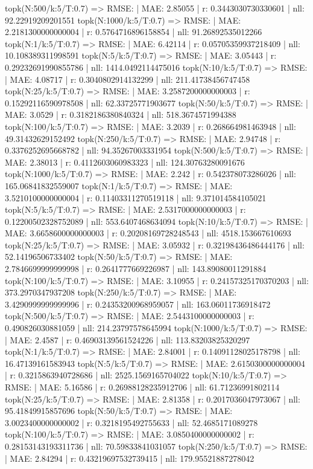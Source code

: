 topk(N:500/k:5/T:0.7) => RMSE: | MAE: 2.85055 | r: 0.3443030730330601 | nll: 92.22919209201551
topk(N:1000/k:5/T:0.7) => RMSE: | MAE: 2.2181300000000004 | r: 0.5764716896158854 | nll: 91.26892535012266
topk(N:1/k:5/T:0.7) => RMSE: | MAE: 6.42114 | r: 0.05705359937218409 | nll: 10.108389311998591
topk(N:5/k:5/T:0.7) => RMSE: | MAE: 3.05443 | r: 0.29232691990855786 | nll: 1414.0492114475016
topk(N:10/k:5/T:0.7) => RMSE: | MAE: 4.08717 | r: 0.3040802914132299 | nll: 211.41738456747458
topk(N:25/k:5/T:0.7) => RMSE: | MAE: 3.2587200000000003 | r: 0.15292116590978508 | nll: 62.33725771903677
topk(N:50/k:5/T:0.7) => RMSE: | MAE: 3.0529 | r: 0.3182186380840324 | nll: 518.3674571994388
topk(N:100/k:5/T:0.7) => RMSE: | MAE: 3.2039 | r: 0.268664981463948 | nll: 49.31432629152492
topk(N:250/k:5/T:0.7) => RMSE: | MAE: 2.94748 | r: 0.3376252695668782 | nll: 94.35267003331954
topk(N:500/k:5/T:0.7) => RMSE: | MAE: 2.38013 | r: 0.4112603060983323 | nll: 124.30763280091676
topk(N:1000/k:5/T:0.7) => RMSE: | MAE: 2.242 | r: 0.542378073286026 | nll: 165.06841832559007
topk(N:1/k:5/T:0.7) => RMSE: | MAE: 3.5210100000000004 | r: 0.11403311270519118 | nll: 9.371014584105021
topk(N:5/k:5/T:0.7) => RMSE: | MAE: 2.5317000000000003 | r: 0.12200502328752089 | nll: 553.6407468634094
topk(N:10/k:5/T:0.7) => RMSE: | MAE: 3.6658600000000003 | r: 0.20208169728248543 | nll: 4518.153667610693
topk(N:25/k:5/T:0.7) => RMSE: | MAE: 3.05932 | r: 0.32198436486444176 | nll: 52.14196506733402
topk(N:50/k:5/T:0.7) => RMSE: | MAE: 2.7846699999999998 | r: 0.2641777669226987 | nll: 143.89080011291884
topk(N:100/k:5/T:0.7) => RMSE: | MAE: 3.10955 | r: 0.24157325170370203 | nll: 373.2970347937208
topk(N:250/k:5/T:0.7) => RMSE: | MAE: 3.4290999999999996 | r: 0.24353200968959057 | nll: 163.06011736918472
topk(N:500/k:5/T:0.7) => RMSE: | MAE: 2.5443100000000003 | r: 0.490826030881059 | nll: 214.23797578645994
topk(N:1000/k:5/T:0.7) => RMSE: | MAE: 2.4587 | r: 0.46903139561524226 | nll: 113.83203825320297
topk(N:1/k:5/T:0.7) => RMSE: | MAE: 2.84001 | r: 0.14091128025178798 | nll: 16.47139161583943
topk(N:5/k:5/T:0.7) => RMSE: | MAE: 2.6150300000000004 | r: 0.3215863940728686 | nll: 2525.1569165704022
topk(N:10/k:5/T:0.7) => RMSE: | MAE: 5.16586 | r: 0.26988128235912706 | nll: 61.71236991802114
topk(N:25/k:5/T:0.7) => RMSE: | MAE: 2.81358 | r: 0.2017036047973067 | nll: 95.41849915857696
topk(N:50/k:5/T:0.7) => RMSE: | MAE: 3.0023400000000002 | r: 0.3218195492755633 | nll: 52.4685171089278
topk(N:100/k:5/T:0.7) => RMSE: | MAE: 3.0850400000000002 | r: 0.28153143193311736 | nll: 70.59833841031057
topk(N:250/k:5/T:0.7) => RMSE: | MAE: 2.84294 | r: 0.43219697532739415 | nll: 179.95521887278042
